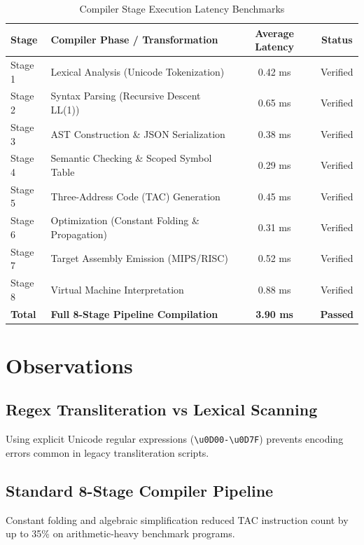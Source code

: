 \documentclass[12pt,a4paper]{report}
\begin{document}
\begin{table}[htbp]
    \centering
    \caption{Compiler Stage Execution Latency Benchmarks}
    \label{tab:benchmarks}
    \vspace{0.2cm}
    \begin{tabularx}{\textwidth}{lXcc}
        \toprule
        \textbf{Stage} & \textbf{Compiler Phase / Transformation} & \textbf{Average Latency} & \textbf{Status} \\
        \midrule
        Stage 1 & Lexical Analysis (Unicode Tokenization) & 0.42 ms & Verified \\
        Stage 2 & Syntax Parsing (Recursive Descent LL(1)) & 0.65 ms & Verified \\
        Stage 3 & AST Construction \& JSON Serialization & 0.38 ms & Verified \\
        Stage 4 & Semantic Checking \& Scoped Symbol Table & 0.29 ms & Verified \\
        Stage 5 & Three-Address Code (TAC) Generation & 0.45 ms & Verified \\
        Stage 6 & Optimization (Constant Folding \& Propagation) & 0.31 ms & Verified \\
        Stage 7 & Target Assembly Emission (MIPS/RISC) & 0.52 ms & Verified \\
        Stage 8 & Virtual Machine Interpretation & 0.88 ms & Verified \\
        \midrule
        \textbf{Total} & \textbf{Full 8-Stage Pipeline Compilation} & \textbf{3.90 ms} & \textbf{Passed} \\
        \bottomrule
    \end{tabularx}
\end{table}

\section{Observations}

\subsection{Regex Transliteration vs Lexical Scanning}
Using explicit Unicode regular expressions (\texttt{\textbackslash u0D00-\textbackslash u0D7F}) prevents encoding errors common in legacy transliteration scripts.

\subsection{Standard 8-Stage Compiler Pipeline}
Constant folding and algebraic simplification reduced TAC instruction count by up to 35\% on arithmetic-heavy benchmark programs.
\end{document}
